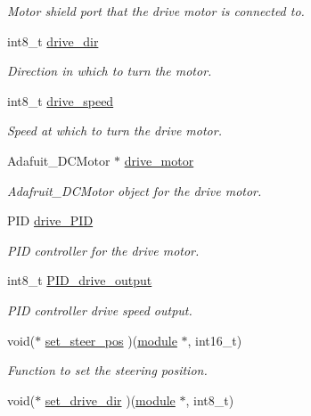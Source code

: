 \begin{DoxyCompactItemize}
\begin{DoxyCompactList}\small\item\em Motor shield port that the drive motor is connected to. \end{DoxyCompactList}\item 
int8\+\_\+t \hyperlink{structmodule__assembly_a4eaba2980fc35d71f1cc2ec15251cf15}{drive\+\_\+dir}
\begin{DoxyCompactList}\small\item\em Direction in which to turn the motor. \end{DoxyCompactList}\item 
int8\+\_\+t \hyperlink{structmodule__assembly_a82019a65507cc9a23d7cdcff82adc20b}{drive\+\_\+speed}
\begin{DoxyCompactList}\small\item\em Speed at which to turn the drive motor. \end{DoxyCompactList}\item 
Adafuit\+\_\+\+D\+C\+Motor $\ast$ \hyperlink{structmodule__assembly_a1c4ce1de4be6b0d640e508245ac5f281}{drive\+\_\+motor}
\begin{DoxyCompactList}\small\item\em Adafruit\+\_\+\+D\+C\+Motor object for the drive motor. \end{DoxyCompactList}\item 
P\+I\+D \hyperlink{structmodule__assembly_ae46a075e88844adda6fd552f87f305c0}{drive\+\_\+\+P\+I\+D}
\begin{DoxyCompactList}\small\item\em P\+I\+D controller for the drive motor. \end{DoxyCompactList}\item 
int8\+\_\+t \hyperlink{structmodule__assembly_a987ebb08eef885c780ce16cb747ad4b8}{P\+I\+D\+\_\+drive\+\_\+output}
\begin{DoxyCompactList}\small\item\em P\+I\+D controller drive speed output. \end{DoxyCompactList}\item 
\hypertarget{structmodule__assembly_addb74ab561efcea659665a3f82daf31d}{}void($\ast$ \hyperlink{structmodule__assembly_addb74ab561efcea659665a3f82daf31d}{set\+\_\+steer\+\_\+pos} )(\hyperlink{structmodule__assembly}{module} $\ast$, int16\+\_\+t)\label{structmodule__assembly_addb74ab561efcea659665a3f82daf31d}

\begin{DoxyCompactList}\small\item\em Function to set the steering position. \end{DoxyCompactList}\item 
\hypertarget{structmodule__assembly_a9b5fb65d6b3dff348c59fbd8b1cf016a}{}void($\ast$ \hyperlink{structmodule__assembly_a9b5fb65d6b3dff348c59fbd8b1cf016a}{set\+\_\+drive\+\_\+dir} )(\hyperlink{structmodule__assembly}{module} $\ast$, int8\+\_\+t)\label{structmodule__assembly_a9b5fb65d6b3dff348c59fbd8b1cf016a}


\end{DoxyCompactItemize}
